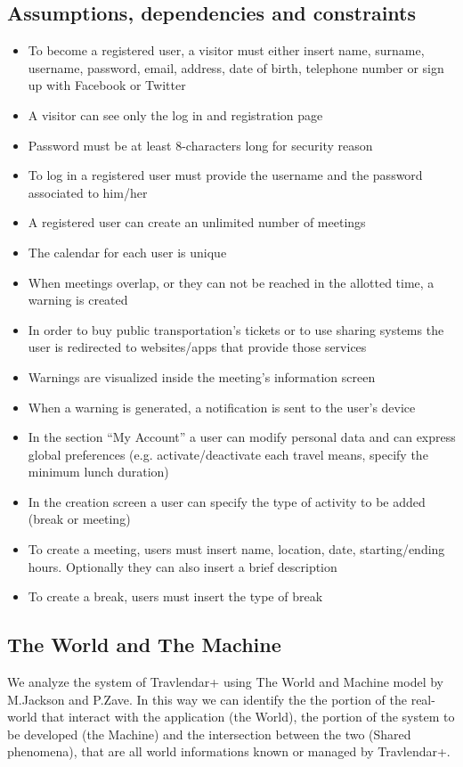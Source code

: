 \documentclass[12pt,titlepage]{article}
\begin{document}
\subsection{Assumptions, dependencies and constraints}\label{sec:mod1}
\begin{itemize}
\item To become a registered user, a visitor must either insert name, surname, username, password, email, address, date of birth, telephone number or sign up with Facebook or Twitter
\item A visitor can see only the log in and registration page
\item Password must be at least 8-characters long for security reason
\item To log in a registered user must provide the username and the password associated to him/her
\item A registered user can create an unlimited number of meetings
\item The calendar for each user is unique
\item When meetings overlap, or they can not be reached in the allotted time, a warning is created
\item In order to buy public transportation's tickets or to use sharing systems the user is redirected to websites/apps that provide those services
\item Warnings are visualized inside the meeting's information screen
\item When a warning is generated, a notification is sent to the user's device 
\item In the section ``My Account'' a user can modify personal data and can express global preferences (e.g. activate/deactivate each travel means, specify the minimum lunch duration)
\item In the creation screen a user can specify the type of activity to be added (break or meeting)
\item To create a meeting, users must insert name, location, date, starting/ending hours. Optionally they can also insert a brief description 
\item To create a break, users must insert the type of break
\end{itemize}
\pagebreak
\subsection{The World and The Machine}\label{sec:mod1}
We analyze the system of Travlendar+ using The World and Machine model by M.Jackson and P.Zave. In this way we can identify the the portion of the real-world that interact with the application (the World), the portion of the system to be developed (the Machine) and the intersection between the two (Shared phenomena), that are all world informations known or managed by Travlendar+.
\end{document}
